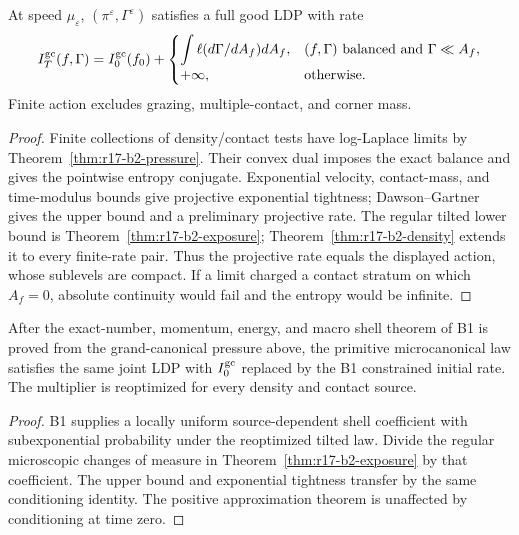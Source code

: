 \begin{theorem}
\label{thm:r17-b2-gc}
At speed \(\mu_\varepsilon\),
\((\pi^\varepsilon,\Gamma^\varepsilon)\) satisfies a full good LDP with
rate
\[
 I_T^{\rm gc}(f,\Gamma)=I_0^{\rm gc}(f_0)+
 \begin{cases}
 \displaystyle\int\ell(d\Gamma/dA_f)dA_f,
   &(f,\Gamma)\text{ balanced and }\Gamma\ll A_f,\\
 +\infty,&\text{otherwise}.
 \end{cases}
\]
Finite action excludes grazing, multiple-contact, and corner mass.
\end{theorem}

\begin{proof}
Finite collections of density/contact tests have log-Laplace limits by
Theorem~\ref{thm:r17-b2-pressure}.  Their convex dual imposes the exact
balance and gives the pointwise entropy conjugate.  Exponential velocity,
contact-mass, and time-modulus bounds give projective exponential tightness;
Dawson--Gartner gives the upper bound and a preliminary projective rate.  The
regular tilted lower bound is Theorem~\ref{thm:r17-b2-exposure};
Theorem~\ref{thm:r17-b2-density} extends it to every finite-rate pair.  Thus
the projective rate equals the displayed action, whose sublevels are compact.
If a limit charged a contact stratum on which \(A_f=0\), absolute continuity
would fail and the entropy would be infinite.
\end{proof}

\begin{theorem}
\label{thm:r17-b2-mc}
After the exact-number, momentum, energy, and macro shell theorem of B1 is
proved from the grand-canonical pressure above, the primitive microcanonical
law satisfies the same joint LDP with \(I_0^{\rm gc}\) replaced by the B1
constrained initial rate.  The multiplier is reoptimized for every density and
contact source.
\end{theorem}

\begin{proof}
B1 supplies a locally uniform source-dependent shell coefficient with
subexponential probability under the reoptimized tilted law.  Divide the
regular microscopic changes of measure in
Theorem~\ref{thm:r17-b2-exposure} by that coefficient.  The upper bound and
exponential tightness transfer by the same conditioning identity.  The
positive approximation theorem is unaffected by conditioning at time zero.
\end{proof}

